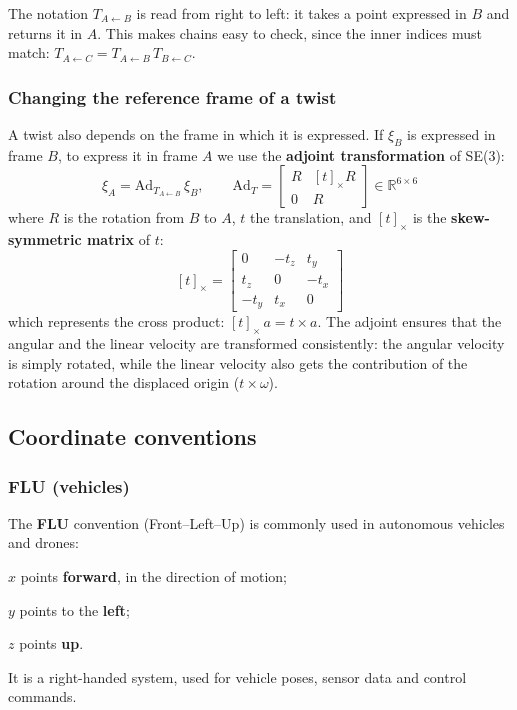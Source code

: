 \begin{infobox}
The notation $T_{A\leftarrow B}$ is read from right to left: it takes a point expressed in $B$ and returns it in $A$. This makes chains easy to check, since the inner indices must match: $T_{A\leftarrow C} = T_{A\leftarrow B}\, T_{B\leftarrow C}$.
\end{infobox}

\subsubsection{Changing the reference frame of a twist}
A twist also depends on the frame in which it is expressed. If $\xi_B$ is expressed in frame $B$, to express it in frame $A$ we use the \textbf{adjoint transformation} of SE(3):
\[
\xi_A = \mathrm{Ad}_{T_{A\leftarrow B}}\, \xi_B, \qquad
\mathrm{Ad}_T = \begin{bmatrix} R & [t]_\times R \\ 0 & R \end{bmatrix} \in \mathbb{R}^{6\times6}
\]
where $R$ is the rotation from $B$ to $A$, $t$ the translation, and $[t]_\times$ is the \textbf{skew-symmetric matrix} of $t$:
\[
[t]_\times = \begin{bmatrix} 0 & -t_z & t_y \\ t_z & 0 & -t_x \\ -t_y & t_x & 0 \end{bmatrix}
\]
which represents the cross product: $[t]_\times\, a = t \times a$.
The adjoint ensures that the angular and the linear velocity are transformed consistently: the angular velocity is simply rotated, while the linear velocity also gets the contribution of the rotation around the displaced origin ($t \times \omega$).

\subsection{Coordinate conventions}
\subsubsection*{FLU (vehicles)}
The \textbf{FLU} convention (Front--Left--Up) is commonly used in autonomous vehicles and drones:
\begin{compactitemize}
    \item $x$ points \textbf{forward}, in the direction of motion;
    \item $y$ points to the \textbf{left};
    \item $z$ points \textbf{up}.
\end{compactitemize}
It is a right-handed system, used for vehicle poses, sensor data and control commands.

